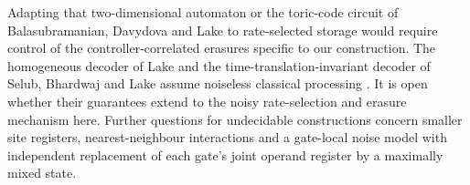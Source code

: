 Adapting that two-dimensional automaton or the toric-code circuit of Balasubramanian, Davydova and Lake \cite{BDL2026} to rate-selected storage would require control of the controller-correlated erasures specific to our construction. The homogeneous decoder of Lake and the time-translation-invariant decoder of Selub, Bhardwaj and Lake assume noiseless classical processing \cite{Lake2025,SBL2026}. It is open whether their guarantees extend to the noisy rate-selection and erasure mechanism here. Further questions for undecidable constructions concern smaller site registers, nearest-neighbour interactions and a gate-local noise model with independent replacement of each gate's joint operand register by a maximally mixed state.
